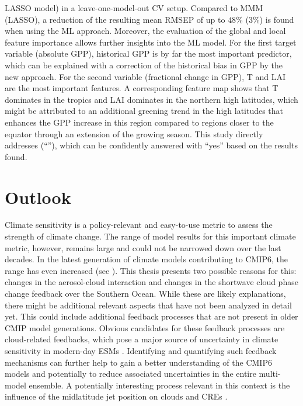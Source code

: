 \ac{LASSO} model) in a leave-one-model-out \ac{CV} setup. Compared to \ac{MMM}
(\ac{LASSO}), a reduction of the resulting mean \ac{RMSEP} of up to $48
\unit{\%}$ ($3 \unit{\%}$) is found when using the \ac{ML} approach. Moreover,
the evaluation of the global and local feature importance allows further
insights into the \ac{ML} model. For the first target variable (absolute
\ac{GPP}), historical \ac{GPP} is by far the most important predictor, which
can be explained with a correction of the historical bias in \ac{GPP} by the
new approach. For the second variable (fractional change in \ac{GPP}), \ac{T}
and \ac{LAI} are the most important features. A corresponding feature map shows
that \ac{T} dominates in the tropics and \ac{LAI} dominates in the northern
high latitudes, which might be attributed to an additional greening trend in
the high latitudes that enhances the \ac{GPP} increase in this region compared
to regions closer to the equator through an extension of the growing season.
This study directly addresses 
(\enquote{\KeyScienceQuestionThree{}}), which can be confidently answered with
\enquote{yes} based on the results found.


\section{Outlook}
\label{sec:07:outlook}

Climate sensitivity is a policy-relevant and easy-to-use metric to assess the
strength of climate change. The range of model results for this important
climate metric, however, remains large and could not be narrowed down over the
last decades. In the latest generation of climate models contributing to
\acs{CMIP}6, the range has even increased (see
). This thesis presents two possible
reasons for this: changes in the aerosol-cloud interaction and changes in the
shortwave cloud phase change feedback over the Southern Ocean. While these are
likely explanations, there might be additional relevant aspects that have not
been analyzed in detail yet. This could include additional feedback processes
that are not present in older \ac{CMIP} model generations. Obvious candidates
for these feedback processes are cloud-related feedbacks, which pose a major
source of uncertainty in climate sensitivity in modern-day \acp{ESM}
\autocite{Boucher2013}. Identifying and quantifying such feedback mechanisms
can further help to gain a better understanding of the \acs{CMIP}6 models and
potentially to reduce associated uncertainties in the entire multi-model
ensemble. A potentially interesting process relevant in this context is the
influence of the midlatitude jet position on clouds and \acp{CRE}
\autocite{Grise2016}.

